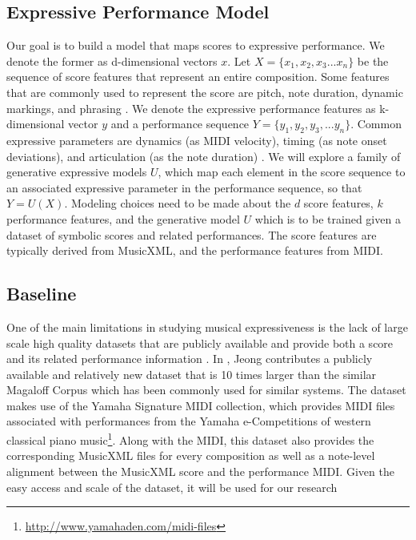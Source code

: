 \documentclass[letterpaper,12pt]{article}
\begin{document}
\subsection{Expressive Performance Model}
Our goal is to build a model that maps scores to expressive performance. We denote the former as d-dimensional vectors $x$. Let $X = \{x_1, x_2, x_3...x_n\}$ be the sequence of score features that represent an entire composition. Some features that are commonly used to represent the score are pitch, note duration, dynamic markings, and phrasing \cite{cancino2018computational}. We denote the expressive performance features as k-dimensional vector $y$ and a performance sequence $Y = \{y_1, y_2, y_3, ... y_n\}$. Common expressive parameters are dynamics (as MIDI velocity), timing (as note onset deviations), and articulation (as the note duration) \cite{cancino2018computational}. We will explore a family of generative expressive models $U$, which map each element in the score sequence to an associated expressive parameter in the performance sequence, so that $Y = U(X)$. Modeling choices need to be made about the $d$ score features, $k$ performance features, and the generative model $U$ which is to be trained given a dataset of symbolic scores and related performances. The score features are typically derived from MusicXML, and the performance features from MIDI. 

\subsection{Baseline}
One of the main limitations in studying musical expressiveness is the lack of large scale high quality datasets that are publicly available and provide both a score and its related performance information \cite{cancino2018computational}. In \cite{jeong2019virtuosonet}, Jeong contributes a publicly available and relatively new dataset that is 10 times larger than the similar Magaloff Corpus \cite{flossmann2010magaloff} which has been commonly used for similar systems. The dataset makes use of the Yamaha Signature MIDI collection, which provides MIDI files associated with performances from the Yamaha e-Competitions of western classical piano music\footnote{\url{http://www.yamahaden.com/midi-files}}. Along with the MIDI, this dataset also provides the corresponding MusicXML files for every composition as well as a note-level alignment between the MusicXML score and the performance MIDI. Given the easy access and scale of the dataset, it will be used for our research
\end{document}
